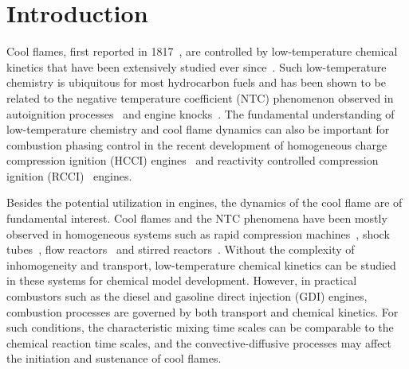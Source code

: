 \documentclass[review,3p,times]{elsarticle}
\begin{document}

\section{Introduction}

Cool flames, first reported in 1817~\cite{davy17}, are controlled by low-temperature chemical kinetics that have been extensively studied ever since~\cite{griffiths87}.  \textcolor{Rev1}{Such low-temperature chemistry is ubiquitous for most hydrocarbon fuels and has been shown to be related to the negative temperature coefficient (NTC) phenomenon observed in autoignition processes~\cite{leppard90,ciezki93} and engine knocks~\cite{griffiths02}.  The fundamental understanding of low-temperature chemistry and cool flame dynamics can also be important for combustion phasing control in the recent development of homogeneous charge compression ignition (HCCI) engines~\cite{kong01,lu11} and reactivity controlled compression ignition (RCCI)~\cite{kokjohn11} engines.}

\textcolor{Rev1}{Besides the potential utilization in engines, the dynamics of the cool flame are of fundamental interest.  Cool flames and the NTC phenomena have been mostly observed in homogeneous systems such as rapid compression machines~\cite{griffiths02b,silke05,di14}, shock tubes~\cite{ciezki93,vasu08,herzler05}, flow reactors~\cite{koert94,curran00} and stirred reactors~\cite{dagaut95,kikui15}.}  Without the complexity of inhomogeneity and transport, low-temperature chemical kinetics can be studied in these systems for chemical model development.  However, in practical combustors such as the diesel and gasoline direct injection (GDI) engines, combustion processes are governed by both transport and chemical kinetics.  For such conditions, the characteristic mixing time scales can be comparable to the chemical reaction time scales, and the convective-diffusive processes may affect the initiation and sustenance of cool flames.
\end{document}
